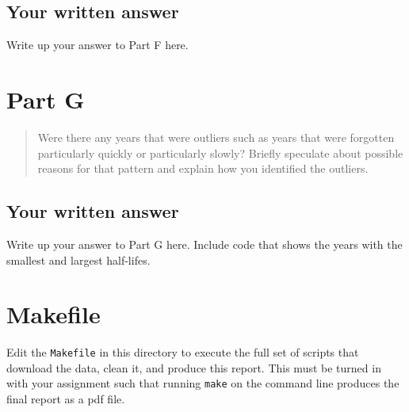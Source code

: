 \documentclass[
]{article}
\begin{document}
\hypertarget{your-written-answer-4}{%
\subsection{Your written answer}\label{your-written-answer-4}}

Write up your answer to Part F here.

\hypertarget{part-g}{%
\section{Part G}\label{part-g}}

\begin{quote}
Were there any years that were outliers such as years that were
forgotten particularly quickly or particularly slowly? Briefly speculate
about possible reasons for that pattern and explain how you identified
the outliers.
\end{quote}

\hypertarget{your-written-answer-5}{%
\subsection{Your written answer}\label{your-written-answer-5}}

Write up your answer to Part G here. Include code that shows the years
with the smallest and largest half-lifes.

\hypertarget{makefile}{%
\section{Makefile}\label{makefile}}

Edit the \texttt{Makefile} in this directory to execute the full set of
scripts that download the data, clean it, and produce this report. This
must be turned in with your assignment such that running \texttt{make}
on the command line produces the final report as a pdf file.
\end{document}
